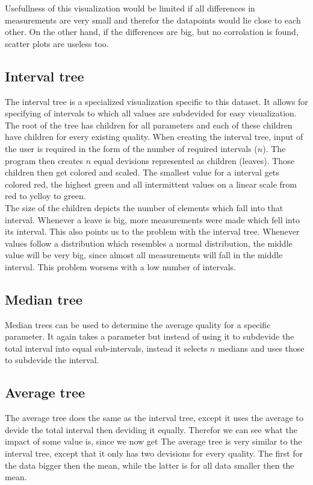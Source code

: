 \documentclass[a4paper,twoside,11pt]{article}
\begin{document}
Usefullness of this visualization would be limited if all differences in measurements are very small and therefor the datapoints would lie close to each other. On the other hand, if the differences are big, but no corrolation is found, scatter plots are useless too.

\subsection{Interval tree}
The interval tree is a specialized visualization specific to this dataset. It allows for specifying of intervals to which all values are subdevided for easy visualization. \\

The root of the tree has children for all parameters and each of these children have children for every existing quality. When creating the interval tree, input of the user is required in the form of the number of required intervals ($n$). The program then creates $n$ equal devisions represented as children (leaves). Those children then get colored and scaled. The smallest value for a interval gets colored red, the highest green and all intermittent values on a linear scale from red to yelloy to green.\\

The size of the children depicts the number of elements which fall into that interval. Whenever a leave is big, more measurements were made which fell into its interval. This also points us to the problem with the interval tree. Whenever values follow a distribution which resembles a normal distribution, the middle value will be very big, since almost all measurements will fall in the middle interval. This problem worsens with a low number of intervals.


\subsection{Median tree}
Median trees can be used to determine the average quality for a specific parameter. It again takes a parameter but instead of using it to subdevide the total interval into equal sub-intervals, instead it selects $n$ medians and uses those to subdevide the interval.

\subsection{Average tree}
The average tree does the same as the interval tree, except it uses the average to devide the total interval then deviding it equally. Therefor we can see what the impact of some value is, since we now get 
The average tree is very similar to the interval tree, except that it only has two devisions for every quality. The first for the data bigger then the mean, while the latter is for all data smaller then the mean.\\
\end{document}
